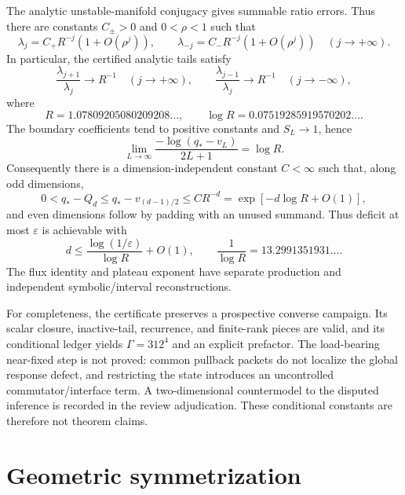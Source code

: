 \documentclass[11pt]{article}
\begin{document}
The analytic unstable-manifold conjugacy gives summable ratio errors.  Thus
there are constants $C_\pm>0$ and $0<\rho<1$ such that
\[
 \lambda_j=C_+R^{-j}(1+O(\rho^j)),\qquad
 \lambda_{-j}=C_-R^{-j}(1+O(\rho^j))
 \quad(j\to+\infty).
\]
In particular, the certified analytic tails satisfy
\[
\frac{\lambda_{j+1}}{\lambda_j}\longrightarrow R^{-1}
\quad(j\to+\infty),\qquad
\frac{\lambda_{j-1}}{\lambda_j}\longrightarrow R^{-1}
\quad(j\to-\infty),
\]
where
\begin{equation}
R=1.07809205080209208\ldots,\qquad
\log R=0.07519285919570202\ldots .
\label{eq:plateauRate}
\end{equation}
The boundary coefficients tend to positive constants and $S_L\to1$, hence
\begin{equation}
\lim_{L\to\infty}
\frac{-\log(q_*-v_L)}{2L+1}=\log R.
\label{eq:dimensionExponent}
\end{equation}
Consequently there is a dimension-independent constant $C<\infty$ such that,
along odd dimensions,
\begin{equation}
0<q_*-Q_d\le q_*-v_{(d-1)/2}
\le C R^{-d}=\exp[-d\log R+O(1)],
\label{eq:dimensionUpper}
\end{equation}
and even dimensions follow by padding with an unused summand.  Thus deficit
at most $\varepsilon$ is achievable with
\begin{equation}
d\leq\frac{\log(1/\varepsilon)}{\log R}+O(1),
\qquad \frac1{\log R}=13.2991351931\ldots .
\label{eq:dimensionSufficient}
\end{equation}
The flux identity and plateau exponent have separate production and
independent symbolic/interval reconstructions.

For completeness, the certificate preserves a prospective converse campaign.
Its scalar closure, inactive-tail, recurrence, and finite-rank pieces are
valid, and its conditional ledger yields $\Gamma=312^4$ and an explicit
prefactor. The load-bearing near-fixed step is not proved: common pullback
packets do not localize the global response defect, and restricting the state
introduces an uncontrolled commutator/interface term. A two-dimensional
countermodel to the disputed inference is recorded in the review
adjudication. These conditional constants are therefore not theorem claims.

\section{Geometric symmetrization}
\end{document}
